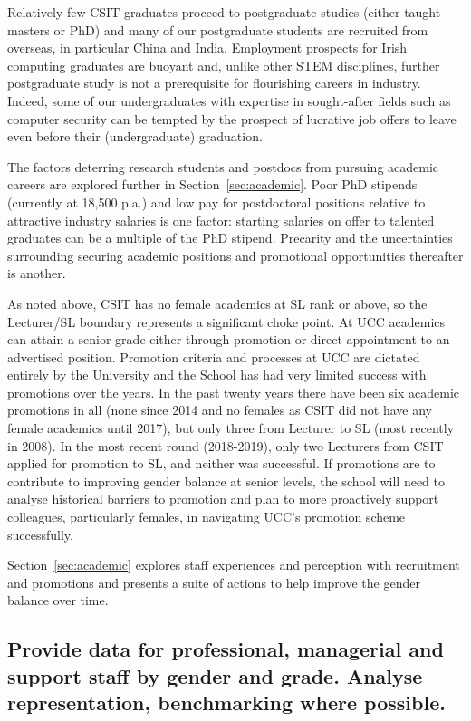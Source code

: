 Relatively few CSIT graduates proceed to postgraduate studies 
(either taught masters or PhD) and many of our postgraduate 
students are  recruited from overseas, in particular China 
and India.
Employment prospects for Irish computing graduates are buoyant and, 
unlike other STEM disciplines, further postgraduate study is not a 
prerequisite for flourishing careers in  industry. Indeed, some of our 
undergraduates with expertise in sought-after fields such as computer 
security can be tempted by the prospect of lucrative 
job offers to leave even before their (undergraduate)
graduation.

The factors deterring research students and postdocs from pursuing 
academic careers are explored further in 
Section~\ref{sec:academic}. 
Poor PhD stipends (currently at \texteuro{}18,500 p.a.) and low
pay for postdoctoral positions relative to attractive industry salaries 
is one factor: starting salaries on offer to talented 
graduates can be a multiple of the PhD stipend. 
Precarity and the uncertainties surrounding  securing academic 
positions and promotional opportunities thereafter is another. 


As noted above, CSIT has no female academics at \ac{SL}
rank or above, so the Lecturer/SL boundary represents
a significant choke point.
At UCC academics can attain a senior grade 
either through promotion or direct appointment to an advertised 
position. Promotion criteria and processes at UCC are 
dictated entirely 
by the University and the School has had very limited success with 
promotions over the years.
In the past twenty years there have been six academic
promotions in all (none since 2014 and no females as CSIT did not have any female academics until 2017), 
but only three from Lecturer to 
SL (most recently in 2008).
In the most recent round (2018-2019), only two 
Lecturers from CSIT applied for promotion to SL, and neither was successful.  
If promotions are to contribute to improving gender balance at senior 
levels, the school will need to analyse historical barriers to promotion
and plan to more  proactively support colleagues, particularly
females, in navigating UCC's promotion scheme successfully. 

Section~\ref{sec:academic} explores staff experiences
and perception with recruitment and  promotions and presents a suite 
of actions to help improve the gender balance over 
time.


\subsection{Provide data for professional, managerial and support staff by gender and grade. Analyse representation, benchmarking where possible.}


